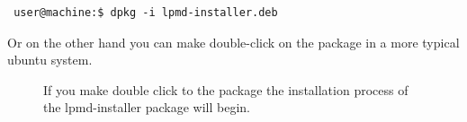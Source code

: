 \begin{verbatim}
 user@machine:$ dpkg -i lpmd-installer.deb
\end{verbatim}

Or on the other hand you can make double-click on the package in a more
typical ubuntu system.

\begin{figure}[h!]
\centering
{}
\caption{If you make double click to the package the installation process of
the lpmd-installer package will begin.}
\label{fig:lpmd-installer}
\end{figure}

